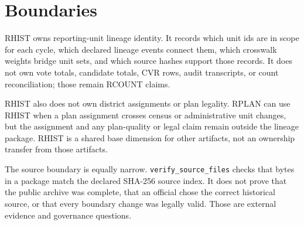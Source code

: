 \section{Boundaries}

RHIST owns reporting-unit lineage identity. It records which unit ids are in
scope for each cycle, which declared lineage events connect them, which
crosswalk weights bridge unit sets, and which source hashes support those
records. It does not own vote totals, candidate totals, CVR rows, audit
transcripts, or count reconciliation; those remain RCOUNT claims.

RHIST also does not own district assignments or plan legality. RPLAN can use
RHIST when a plan assignment crosses census or administrative unit changes, but
the assignment and any plan-quality or legal claim remain outside the lineage
package. RHIST is a shared base dimension for other artifacts, not an ownership
transfer from those artifacts.

The source boundary is equally narrow. \texttt{verify\_source\_files} checks
that bytes in a package match the declared SHA-256 source index. It does not
prove that the public archive was complete, that an official chose the correct
historical source, or that every boundary change was legally valid. Those are
external evidence and governance questions.
